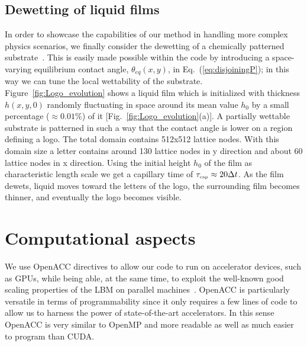 \subsection{Dewetting of liquid films}
In order to showcase the capabilities of our method in handling more complex physics scenarios, we finally consider the dewetting of a chemically patterned substrate~\cite{karguptaDewettingThinFilms2002,brasjenDewettingThinLiquid2013}. 
This is easily made possible within the code by introducing a space-varying equilibrium contact angle, $\theta_{eq}(x,y)$, in Eq.~(\ref{eq:disjoiningP}); in this way we can tune the local wettability of the substrate. 
Figure~\ref{fig:Logo_evolution} shows a liquid film which is initialized with thickness $h(x,y,0)$ randomly fluctuating in space around its mean value $h_0$ by a small percentage ($\approx 0.01\%$)  of it [Fig.~\ref{fig:Logo_evolution}(a)]. 
A partially wettable substrate is patterned in such a way that the contact angle is lower on a region defining a logo. 
The total domain contains 512x512 lattice nodes. 
With this domain size a letter contains around 130 lattice nodes in y direction and about 60 lattice nodes in x direction.
Using the initial height $h_0$ of the film as characteristic length scale we get a capillary time of $\tau_{\mbox{\tiny{cap}}} \approx 20\Delta t$. 
As the film dewets, liquid moves toward the letters of the logo, the surrounding film becomes thinner, and eventually the logo becomes visible.

\section{Computational aspects}
We use OpenACC directives to allow our code to run on accelerator devices, such as GPUs, while being able, at the same time, to exploit the well-known good scaling properties of the LBM on parallel machines~\cite{chandrasekaranOpenACCProgrammersConcepts2017}. 
OpenACC is particularly versatile in terms of programmability since it only requires a few lines of code to allow us to harness the power of state-of-the-art accelerators. 
In this sense OpenACC is very similar to OpenMP and more readable as well as much easier to program than CUDA.

